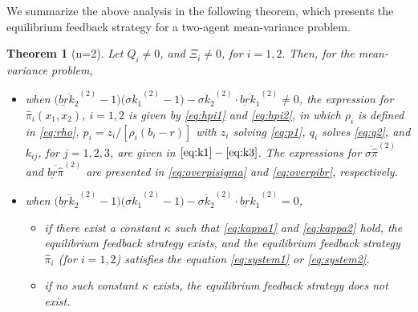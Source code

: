 \documentclass[11pt]{article}
\newtheorem{theorem}{Theorem}[section]
\numberwithin{equation}{section}
\begin{document}
	We summarize the above analysis in the following theorem, which presents the equilibrium  feedback  strategy for a two-agent mean-variance problem.
	\begin{theorem}[n=2]\label{th:main2}
		Let   \(Q_i\neq 0\), and \(\Xi_i\neq 0\), for $i=1,2.$ Then, for the mean-variance problem,
		\begin{itemize}
			\item[$(1)$]  when \(\big(\overline{\underline{br}k_2}^{(2)}-1\big)\big(\overline{\sigma k_1}^{(2)}-1\big)-\overline{\sigma k_2}^{(2)}\cdot\overline{\underline{br}k_1}^{(2)}\neq 0\), the expression for \(\widehat{\pi}_i(x_1,x_2)\), $i=1,2$ is given by \eqref{eq:hpi1} and \eqref{eq:hpi2}, in which \(\rho_i\) is defined in \eqref{eq:rho}, \(p_i=z_i/[\rho_i(b_i-r)]\) with \(z_i\) solving \eqref{eq:p1}, \(q_i\) solves \eqref{eq:q2}, and \(k_{ij}\), for \(j=1,2,3\), are given in \(\eqref{eq:k1}-\eqref{eq:k3}\). The expressions for \(\overline{\sigma\widehat{\pi}}^{(2)}\) and \(\overline{\underline{br} \widehat{\pi}}^{(2)}\) are presented in \eqref{eq:overpisigma} and \eqref{eq:overpibr}, respectively.
\item[$(2)$]  when \(\big(\overline{\underline{br}k_2}^{(2)}-1\big)\big(\overline{\sigma k_1}^{(2)}-1\big)-\overline{\sigma k_2}^{(2)}\cdot\overline{\underline{br}k_1}^{(2)}= 0\),
\begin{itemize}
\item[$(a)$] if there exist a constant \(\kappa\) such that \eqref{eq:kappa1} and \eqref{eq:kappa2} hold, the equilibrium feedback strategy exists, and the equilibrium feedback strategy \(\widehat{\pi}_i\) (for \(i=1,2\)) satisfies the equation \eqref{eq:system1} or \eqref{eq:system2}.
				
					\item[$(b)$]  if no such constant \(\kappa\) exists, the equilibrium feedback strategy does not exist.
			\end{itemize}
	
		\end{itemize}
	\end{theorem}
	
\end{document}
